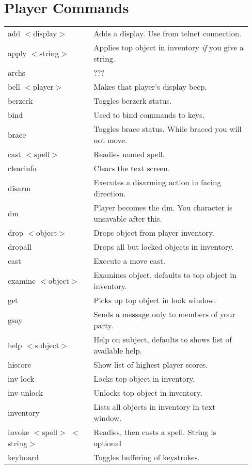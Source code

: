 \chapter{Player Commands}
\label{app:commands}
{\scriptsize
\begin{longtable}{p{4cm}p{9cm}}
add $<$display$>$ & Adds a display. Use from telnet connection. \\ 
apply $<$string$>$ & Applies top object in inventory {\em if} you give a string. \\ 
archs & ??? \\ 
bell $<$player$>$ & Makes that player's display beep. \\ 
berzerk & Toggles berzerk status. \\ 
bind & Used to bind commands to keys. \\ 
brace & Toggles brace status. While braced you will not move. \\ 
cast $<$spell$>$ & Readies named spell. \\ 
clearinfo & Clears the text screen. \\ 
disarm & Executes a disarming action in facing direction. \\ 
dm & Player becomes the dm. You character is unsavable after this. \\ 
drop $<$object$>$ & Drops object from player inventory. \\ 
dropall &  Drops all but locked objects in inventory. \\ 
east & Execute a move east. \\ 
examine $<$object$>$ & Examines object, defaults to top object in inventory. \\ 
get & Picks up top object in look window. \\ 
gsay & Sends a message only to members of your party.\\ 
help $<$subject$>$ & Help on subject, defaults to shows list of available help. \\
hiscore & Show list of highest player scores. \\ 
inv-lock & Locks top object in inventory. \\ 
inv-unlock & Unlocks top object in inventory. \\ 
inventory & Lists all objects in inventory in text window. \\ 
invoke $<$spell$>$ $<$string$>$ & Readies, then casts a spell. String is optional \\
keyboard & Toggles buffering of keystrokes. \\ 

\end{longtable}}
